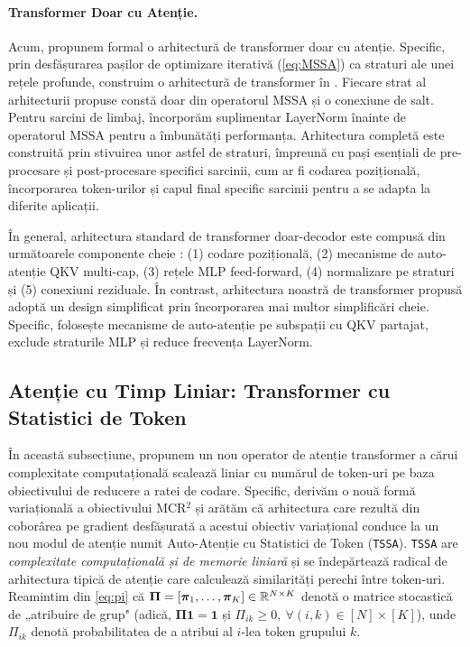 \documentclass[../../book-main_ro.tex]{subfiles}
\begin{document}
\paragraph{Transformer Doar cu Atenție.} Acum, propunem formal o arhitectură de transformer doar cu atenție. Specific, prin desfășurarea pașilor de optimizare iterativă (\ref{eq:MSSA}) ca straturi ale unei rețele profunde, construim o arhitectură de transformer în . Fiecare strat al arhitecturii propuse constă doar din operatorul MSSA și o conexiune de salt. Pentru sarcini de limbaj, încorporăm suplimentar LayerNorm înainte de operatorul MSSA pentru a îmbunătăți performanța. Arhitectura completă este construită prin stivuirea unor astfel de straturi, împreună cu pași esențiali de pre-procesare și post-procesare specifici sarcinii, cum ar fi codarea pozițională, încorporarea token-urilor și capul final specific sarcinii pentru a se adapta la diferite aplicații.




În general, arhitectura standard de transformer doar-decodor este compusă din următoarele componente cheie \cite{vaswani2017attention}: (1) codare pozițională, (2) mecanisme de auto-atenție QKV multi-cap, (3) rețele MLP feed-forward, (4) normalizare pe straturi și (5) conexiuni reziduale. În contrast, arhitectura noastră de transformer propusă adoptă un design simplificat prin încorporarea mai multor simplificări cheie. Specific, folosește mecanisme de auto-atenție pe subspații cu QKV partajat, exclude straturile MLP și reduce frecvența LayerNorm.








\subsection{Atenție cu Timp Liniar: Transformer cu Statistici de Token}\label{sub:tost}

În această subsecțiune, propunem un nou operator de atenție transformer a cărui complexitate computațională scalează liniar cu numărul de token-uri pe baza obiectivului de reducere a ratei de codare. Specific, derivăm o nouă formă variațională a obiectivului MCR$^2$ și arătăm că arhitectura care rezultă din coborârea pe gradient desfășurată a acestui obiectiv variațional conduce la un nou modul de atenție numit Auto-Atenție cu Statistici de Token (\texttt{TSSA}). \texttt{TSSA} are {\em complexitate computațională și de memorie liniară} și se îndepărtează radical de arhitectura tipică de atenție care calculează similarități perechi între token-uri. Reamintim din \eqref{eq:pi} că $\bm \Pi = [\bm \pi_1, \ldots, \bm \pi_K] \in \mathbb{R}^{N \times K}$ denotă o matrice stocastică de „atribuire de grup" (adică, $\bm \Pi \bm 1 = \bm 1$ și $\Pi_{ik} \geq 0, \  \forall (i,k) \in [N] \times [K]$), unde $\Pi_{ik}$ denotă probabilitatea de a atribui al $i$-lea token grupului $k$.
\end{document}
